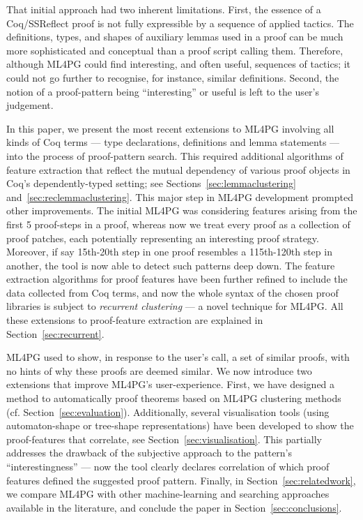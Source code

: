 That initial approach had two inherent limitations. First, the essence of a Coq/SSReflect proof is not fully expressible by a sequence of applied tactics. The definitions, types, and shapes of auxiliary lemmas used in a proof can be much more sophisticated and conceptual than a proof script calling them. Therefore, although ML4PG could find interesting, and often useful, sequences of tactics; it could not go further to recognise, for instance, similar definitions. Second, the notion of a proof-pattern being ``interesting'' or useful is left to the user's judgement.
 
In this paper, we present the most recent extensions to ML4PG  involving all kinds of Coq terms --- type declarations, definitions and lemma statements --- into the process of proof-pattern search. This required additional algorithms of feature extraction that reflect the mutual dependency of various proof objects in Coq\rq{}s dependently-typed setting; see Sections~\ref{sec:lemmaclustering} and~\ref{sec:reclemmaclustering}. 
This major step in ML4PG development prompted other improvements. The initial ML4PG was considering features arising from the first 5 proof-steps in a proof, whereas now we treat every proof as a collection of
proof patches, each potentially
representing an interesting proof strategy. Moreover, if say 15th-20th step in one proof resembles a 115th-120th step in another, the tool is now able to detect such patterns deep down.  
The feature extraction algorithms for proof features have been further refined to include the data collected from Coq terms, and now the 
whole syntax of the chosen proof libraries is subject
to \emph{recurrent clustering} --- a novel technique for ML4PG. %
All these extensions to proof-feature extraction are explained in Section~\ref{sec:recurrent}. 

ML4PG used to show, in response to the user's call, a set of similar proofs,
with no hints of why these proofs are deemed similar. We now introduce two extensions that improve ML4PG's user-experience. 
First, we have designed a method to automatically proof theorems based on ML4PG clustering methods (cf. Section~\ref{sec:evaluation}). Additionally, several visualisation tools (using automaton-shape or tree-shape representations) have been developed to show the proof-features that correlate, see Section~\ref{sec:visualisation}. This partially addresses the drawback of the subjective approach to 
the pattern's ``interestingness'' --- now 
the tool clearly declares correlation of which proof features defined the suggested proof pattern. 
Finally, in Section~\ref{sec:relatedwork}, we compare ML4PG with other machine-learning and searching approaches available in the literature, and conclude the paper in Section~\ref{sec:conclusions}.


